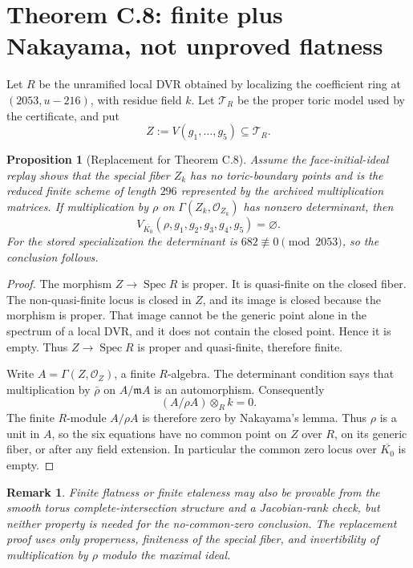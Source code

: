 \documentclass[11pt]{article}
\newtheorem{proposition}{Proposition}
\newtheorem{remark}{Remark}
\newcommand{\Spec}{\operatorname{Spec}}
\begin{document}
\section{Theorem C.8: finite plus Nakayama, not unproved flatness}

Let $R$ be the unramified local DVR obtained by localizing the coefficient
ring at $(2053,u-216)$, with residue field $k$.  Let $\mathcal T_R$ be the
proper toric model used by the certificate, and put
\[
 Z:=V(g_1,\dots,g_5)\subseteq\mathcal T_R.
\]

\begin{proposition}[Replacement for Theorem C.8]
Assume the face-initial-ideal replay shows that the special fiber $Z_k$ has
no toric-boundary points and is the reduced finite scheme of length $296$
represented by the archived multiplication matrices.  If multiplication by
$\rho$ on $\Gamma(Z_k,\mathcal O_{Z_k})$ has nonzero determinant, then
\[
 V_{\overline{K_0}}(\rho,g_1,g_2,g_3,g_4,g_5)=\varnothing.
\]
For the stored specialization the determinant is
$682\not\equiv0\pmod{2053}$, so the conclusion follows.
\end{proposition}

\begin{proof}
The morphism $Z\to\Spec R$ is proper.  It is quasi-finite on the closed
fiber.  The non-quasi-finite locus is closed in $Z$, and its image is closed
because the morphism is proper.  That image cannot be the generic point
alone in the spectrum of a local DVR, and it does not contain the closed
point.  Hence it is empty.  Thus $Z\to\Spec R$ is proper and quasi-finite,
therefore finite.

Write $A=\Gamma(Z,\mathcal O_Z)$, a finite $R$-algebra.  The determinant
condition says that multiplication by $\bar\rho$ on $A/\mathfrak mA$ is an
automorphism.  Consequently
\[
 (A/\rho A)\otimes_R k=0.
\]
The finite $R$-module $A/\rho A$ is therefore zero by Nakayama's lemma.
Thus $\rho$ is a unit in $A$, so the six equations have no common point on
$Z$ over $R$, on its generic fiber, or after any field extension.  In
particular the common zero locus over $\overline{K_0}$ is empty.
\end{proof}

\begin{remark}
Finite flatness or finite etaleness may also be provable from the smooth
torus complete-intersection structure and a Jacobian-rank check, but neither
property is needed for the no-common-zero conclusion.  The replacement
proof uses only properness, finiteness of the special fiber, and invertibility
of multiplication by $\rho$ modulo the maximal ideal.
\end{remark}
\end{document}

